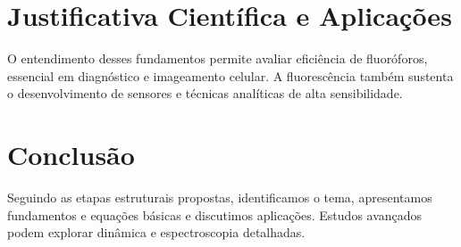 \documentclass[11pt]{article}
\begin{document}
\section{Justificativa Cient\'ifica e Aplica\c{c}\~oes}
O entendimento desses fundamentos permite avaliar efici\^encia de fluor\'oforos, essencial em diagn\'ostico e imageamento celular. A fluoresc\^encia tamb\'em sustenta o desenvolvimento de sensores e t\'ecnicas anal\'iticas de alta sensibilidade.

\section{Conclus\~ao}
Seguindo as etapas estruturais propostas, identificamos o tema, apresentamos fundamentos e equa\c{c}\~oes b\'asicas e discutimos aplica\c{c}\~oes. Estudos avan\c{c}ados podem explorar din\^amica e espectroscopia detalhadas.



\end{document}
